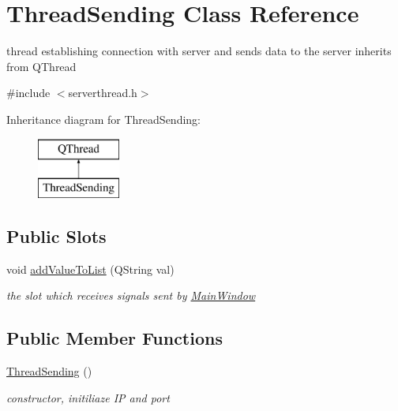 \hypertarget{class_thread_sending}{\section{Thread\-Sending Class Reference}
\label{class_thread_sending}
}


thread establishing connection with server and sends data to the server inherits from Q\-Thread  




{\ttfamily \#include $<$serverthread.\-h$>$}

Inheritance diagram for Thread\-Sending\-:\begin{figure}[H]
\begin{center}
\leavevmode
\includegraphics[height=2.000000cm]{class_thread_sending}
\end{center}
\end{figure}
\subsection*{Public Slots}
\begin{DoxyCompactItemize}
\item 
void \hyperlink{class_thread_sending_aae57341ed5f031338c6ba10f35d277c5}{add\-Value\-To\-List} (Q\-String val)
\begin{DoxyCompactList}\small\item\em the slot which receives signals sent by \hyperlink{class_main_window}{Main\-Window} \end{DoxyCompactList}\end{DoxyCompactItemize}
\subsection*{Public Member Functions}
\begin{DoxyCompactItemize}
\item 
\hypertarget{class_thread_sending_abdd5e874ce261b64bde9066e4369904f}{\hyperlink{class_thread_sending_abdd5e874ce261b64bde9066e4369904f}{Thread\-Sending} ()}\label{class_thread_sending_abdd5e874ce261b64bde9066e4369904f}

\begin{DoxyCompactList}\small\item\em constructor, initiliaze I\-P and port \end{DoxyCompactList}\end{DoxyCompactItemize}
